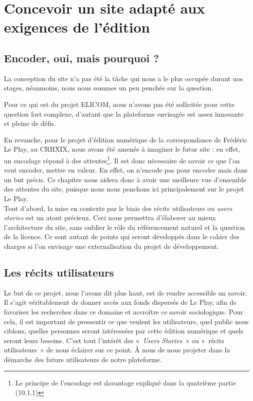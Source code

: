\chapter{Concevoir un site adapté aux exigences de l'édition}

\section{Encoder, oui, mais pourquoi ?}
La conception du site n'a pas été la tâche qui nous a le plus occupée durant nos stages, néanmoins, nous nous sommes un peu penchée sur la question.

Pour ce qui est du projet ELICOM, nous n'avons pas été sollicitée pour cette question fort complexe, d'autant que la plateforme envisagée est assez innovante et pleine de défis.

En revanche, pour le projet d'édition numérique de la correspondance de Frédéric Le Play, au CRHXIX, nous avons été amenée à imaginer le futur site : en effet, un encodage répond à des attentes\footnote{Le principe de l'encodage est davantage expliqué dans la quatrième partie (10.1.1)}. Il est donc nécessaire de savoir ce que l'on veut encoder, mettre en valeur. En effet, on n'encode pas pour encoder mais dans un but précis. Ce chapitre nous aidera donc à avoir une meilleure vue d'ensemble des attentes du site, puisque nous nous penchons ici principalement sur le projet Le Play. \\

Tout d'abord, la mise en contexte par le biais des récits utilisateurs ou \emph{users stories} est un atout précieux. Ceci nous permettra d'élaborer au mieux l'architecture du site, sans oublier le rôle du référencement naturel et la question de la licence.
Ce sont autant de points qui seront développés dans le cahier des charges si l'on envisage une externalisation du projet de développement.

\section{Les récits utilisateurs}

Le but de ce projet, nous l’avons dit plus haut, est de rendre accessible un savoir. Il s’agit véritablement de donner accès aux fonds dispersés de Le Play, afin de favoriser les recherches dans ce domaine et accroître ce savoir sociologique. Pour cela, il est important de pressentir ce que veulent les utilisateurs, quel public nous ciblons, quelles personnes seront intéressées par cette édition numérique et quels seront leurs besoins. 
C’est tout l’intérêt des «\emph{ Users Stories }» ou « récits utilisateurs » de nous éclairer sur ce point. À nous de nous projeter dans la démarche des futurs utilisateurs de notre plateforme.

